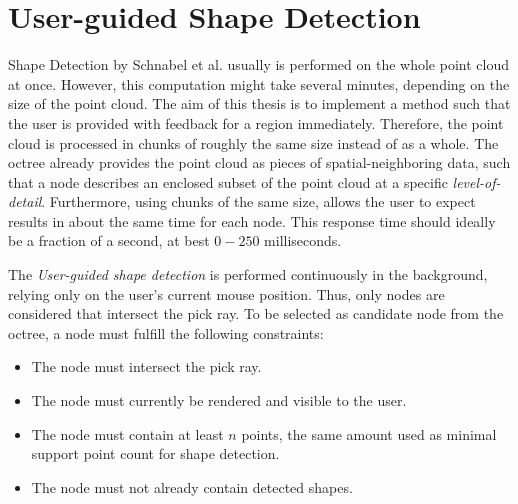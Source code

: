 \section{User-guided Shape Detection}
\label{sec:user_guided_sd}

Shape Detection by Schnabel et al.\cite{schnabel-2007-efficient} usually is performed on the whole point cloud at once. However, this computation might take several minutes, depending on the size of the point cloud. The aim of this thesis is to implement a method such that the user is provided with feedback for a region immediately. Therefore, the point cloud is processed in chunks of roughly the same size instead of as a whole. The octree already provides the point cloud as pieces of spatial-neighboring data, such that a node describes an enclosed subset of the point cloud at a specific \textit{level-of-detail}. Furthermore, using chunks of the same size, allows the user to expect results in about the same time for each node. This response time should ideally be a fraction of a second, at best $0-250$ milliseconds. 

The \textit{User-guided shape detection} is performed continuously in the background, relying only on the user's current mouse position. Thus, only nodes are considered that intersect the pick ray. To be selected as candidate node from the octree, a node must fulfill the following constraints: 
\begin{itemize}
    \item The node must intersect the pick ray.
    \item The node must currently be rendered and visible to the user. 
    \item The node must contain at least $n$ points, the same amount used as minimal support point count for shape detection.
    \item The node must not already contain detected shapes.
\end{itemize}

